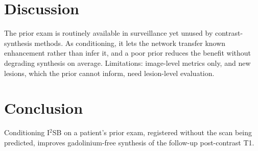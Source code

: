 \section*{Discussion}
The prior exam is routinely available in surveillance yet unused by contrast-synthesis methods.
As conditioning, it lets the network transfer known enhancement rather than infer it, and a
poor prior reduces the benefit without degrading synthesis on average. Limitations: image-level
metrics only, and new lesions, which the prior cannot inform, need lesion-level evaluation.

\section*{Conclusion}
Conditioning I$^2$SB on a patient's prior exam, registered without the scan being predicted,
improves gadolinium-free synthesis of the follow-up post-contrast T1.

